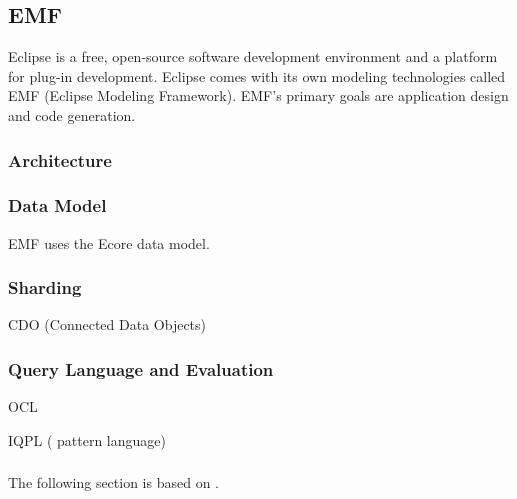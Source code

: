 
\subsection{EMF}
\label{emf}

Eclipse is a free, open-source software development environment and a platform for plug-in development. Eclipse comes with its own modeling technologies called EMF (Eclipse Modeling Framework). EMF's primary goals are application design and code generation.

\subsubsection{Architecture}



\subsubsection{Data Model}

EMF uses the Ecore data model.


\subsubsection{Sharding}

CDO (Connected Data Objects)

\subsubsection{Query Language and Evaluation}

OCL

IQPL (\iq{} pattern language)

\subsubsection{\eiq{}}
\label{subsec:eiq}

The following section is based on \cite{CsikosMasters}.


